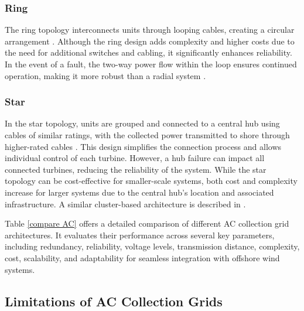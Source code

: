 \documentclass{ieeeaccess}
\begin{document}
\subsubsection{\textbf{Ring}} The ring topology interconnects units through looping cables, creating a circular arrangement \cite{korompili2016review}. Although the ring design adds complexity and higher costs due to the need for additional switches and cabling, it significantly enhances reliability. In the event of a fault, the two-way power flow within the loop ensures continued operation, making it more robust than a radial system \cite{rahman2021comparison}.

\subsubsection{\textbf{Star}} In the star topology, units are grouped and connected to a central hub using cables of similar ratings, with the collected power transmitted to shore through higher-rated cables \cite{raza2020multi}. This design simplifies the connection process and allows individual control of each turbine. However, a hub failure can impact all connected turbines, reducing the reliability of the system. While the star topology can be cost-effective for smaller-scale systems, both cost and complexity increase for larger systems due to the central hub's location and associated infrastructure. A similar cluster-based architecture is described in \cite{li2021review}.

Table \ref{compare AC} offers a detailed comparison of different AC collection grid architectures. It evaluates their performance across several key parameters, including redundancy, reliability, voltage levels, transmission distance, complexity, cost, scalability, and adaptability for seamless integration with offshore wind systems. 

\subsection{\textbf{Limitations of AC Collection Grids}}
\end{document}

